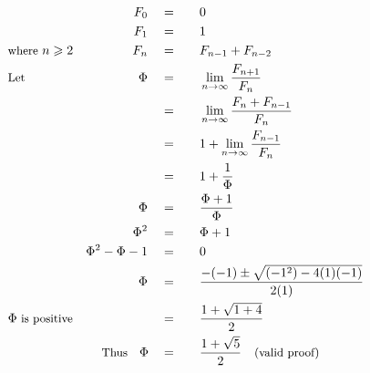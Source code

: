 \begin{alignat*}{5}
&\,&F_0\quad&=\quad&&0\\
&\,&F_1\quad&=&&1\\
&\small\text{where }n\geqslant2&F_n\quad&=&&F_{n-1}+F_{n-2}\\
&\small\text{Let }&\Phi\quad&=&&\lim_{n\to\infty}\frac{F_{n+1}}{F_n}\\
&\,&\,&=&&\lim_{n\to\infty}\frac{F_n+F_{n-1}}{F_n}\\
&\,&\,&=&&1+\lim_{n\to\infty}\frac{F_{n-1}}{F_n}\\
&\,&\,&=&&1+\frac{1}{\Phi}\\
&\,&\Phi\quad&=&&\frac{\Phi+1}{\Phi}\\
&\,&\Phi^2\quad&=&&\Phi+1\\
&\,&\Phi^2-\Phi-1\quad&=&&0\\
&\,&\Phi\quad&=&&\frac{-(-1)\pm\sqrt{(-1^2)-4(1)(-1)}}{2(1)}\\
&\small\Phi\text{ is positive}&\,&=&&\frac{1+\sqrt{1+4}}{2}\\
&\,&\small\text{Thus}\quad\Phi\quad&=&&\frac{1+\sqrt{5}}{2}\quad\small\text{(valid proof)}
\end{alignat*}
